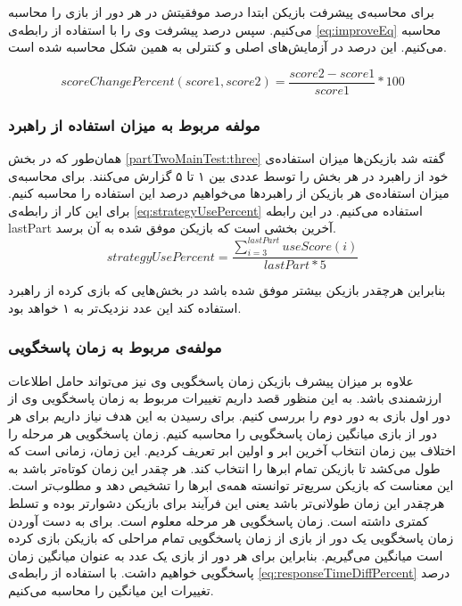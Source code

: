 \documentclass[twoside, a4paper,11pt]{book}
\numberwithin{equation}{chapter}
\numberwithin{table}{chapter}
\numberwithin{figure}{chapter}
\numberwithin{equation}{chapter}
\begin{document}
برای محاسبه‌ی پیشرفت بازیکن ابتدا درصد موفقیتش در هر دور از بازی را محاسبه می‌کنیم. سپس درصد پیشرفت وی را با استفاده از رابطه‌ی \ref{eq:improveEq} محاسبه می‌کنیم. این درصد در آزمایش‌های اصلی و کنترلی به همین شکل محاسبه شده است.

\begin{equation}
\label{eq:improveEq}
	scoreChangePercent(score1, score2) = \frac{score2 - score1}{score1}*100
\end{equation}

\subsubsection{مولفه مربوط به میزان استفاده از راهبرد}

همان‌طور که در بخش \ref{partTwoMainTest:three} گفته شد بازیکن‌ها میزان استفاده‌ی خود از راهبرد در هر بخش را توسط عددی بین ۱ تا ۵ گزارش می‌کنند. برای محاسبه‌ی میزان استفاده‌ی هر بازیکن از راهبردها می‌خواهیم درصد این استفاده را محاسبه کنیم. برای این کار از رابطه‌ی \ref{eq:strategyUsePercent} استفاده می‌کنیم. در این رابطه lastPart آخرین بخشی است که بازیکن موفق شده به آن برسد.
\begin{equation}
\label{eq:strategyUsePercent}
strategyUsePercent = \frac{\sum_{i=3}^{lastPart} useScore(i)}{lastPart*5}
\end{equation}

بنابراین هرچقدر بازیکن بیشتر موفق شده باشد در بخش‌هایی که بازی کرده از راهبرد استفاده کند این عدد نزدیک‌تر به ۱ خواهد بود.

\subsubsection{مولفه‌ی مربوط به زمان پاسخگویی}
علاوه بر میزان پیشرف بازیکن زمان پاسخگویی وی نیز می‌تواند حامل اطلاعات ارزشمندی باشد. به این منظور قصد داریم تغییرات مربوط به زمان پاسخگویی وی از دور اول بازی به دور دوم را بررسی کنیم. برای رسیدن به این هدف نیاز داریم برای هر دور از بازی میانگین زمان پاسخگویی را محاسبه کنیم. زمان پاسخگویی هر مرحله را اختلاف بین زمان انتخاب آخرین ابر و اولین ابر تعریف کردیم. این زمان، زمانی است که طول می‌کشد تا بازیکن تمام ابرها را انتخاب کند. هر چقدر این زمان کوتاه‌تر باشد به این معناست که بازیکن سریع‌تر توانسته همه‌ی ابرها را تشخیص دهد و مطلوب‌تر است. هرچقدر این زمان طولانی‌تر باشد یعنی این فرآیند برای بازیکن دشوارتر بوده و تسلط کمتری داشته است.
زمان پاسخگویی هر مرحله معلوم است. برای به دست آوردن زمان پاسخگویی یک دور از بازی از زمان پاسخگویی تمام مراحلی که بازیکن بازی کرده است میانگین می‌گیریم. بنابراین برای هر دور از بازی یک عدد به عنوان میانگین زمان پاسخگویی خواهیم داشت. با استفاده از رابطه‌ی \ref{eq:responseTimeDiffPercent} درصد تغییرات این میانگین را محاسبه می‌کنیم.
\end{document}
